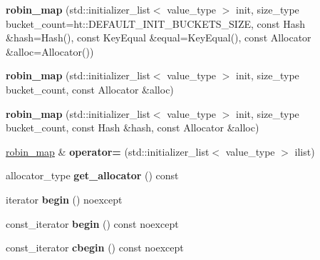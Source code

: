 \begin{DoxyCompactItemize}
\item 
\mbox{\label{classtsl_1_1robin__map_afbedebeddfabe7184f088c54a02d7b6a}} 
{\bfseries robin\+\_\+map} (std\+::initializer\+\_\+list$<$ value\+\_\+type $>$ init, size\+\_\+type bucket\+\_\+count=ht\+::\+D\+E\+F\+A\+U\+L\+T\+\_\+\+I\+N\+I\+T\+\_\+\+B\+U\+C\+K\+E\+T\+S\+\_\+\+S\+I\+ZE, const Hash \&hash=Hash(), const Key\+Equal \&equal=Key\+Equal(), const Allocator \&alloc=Allocator())
\item 
\mbox{\label{classtsl_1_1robin__map_ad32e694b564bb96f1fccaae861db3d50}} 
{\bfseries robin\+\_\+map} (std\+::initializer\+\_\+list$<$ value\+\_\+type $>$ init, size\+\_\+type bucket\+\_\+count, const Allocator \&alloc)
\item 
\mbox{\label{classtsl_1_1robin__map_a45ed1674b377e88c37972b21d8398883}} 
{\bfseries robin\+\_\+map} (std\+::initializer\+\_\+list$<$ value\+\_\+type $>$ init, size\+\_\+type bucket\+\_\+count, const Hash \&hash, const Allocator \&alloc)
\item 
\mbox{\label{classtsl_1_1robin__map_a6708108c82d353ba9e634265ef8b1cf1}} 
\mbox{\hyperlink{classtsl_1_1robin__map}{robin\+\_\+map}} \& {\bfseries operator=} (std\+::initializer\+\_\+list$<$ value\+\_\+type $>$ ilist)
\item 
\mbox{\label{classtsl_1_1robin__map_a6e5e61c1fce7fc1427938808f0c838fc}} 
allocator\+\_\+type {\bfseries get\+\_\+allocator} () const
\item 
\mbox{\label{classtsl_1_1robin__map_a5f2dfe98f4e2e4f968a6ed4e61598f1a}} 
iterator {\bfseries begin} () noexcept
\item 
\mbox{\label{classtsl_1_1robin__map_a8688dcabbc0c5174fb74e828badfdb95}} 
const\+\_\+iterator {\bfseries begin} () const noexcept
\item 
\mbox{\label{classtsl_1_1robin__map_ade90a17a9ed2bd123d77f8083e618359}} 
const\+\_\+iterator {\bfseries cbegin} () const noexcept
\item 
\mbox{\label{classtsl_1_1robin__map_ac01a41b854aba819088233eabc66458d}} 

\end{DoxyCompactItemize}
